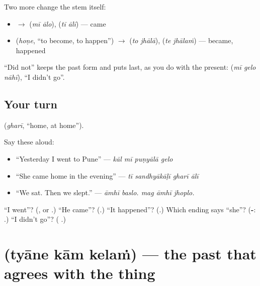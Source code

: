Two more change the stem itself:

\begin{itemize}
\raggedright
  \item \textbf{} $\to$ \textbf{ } (\emph{mī ālo}), \textbf{ } (\emph{tī ālī}) — came
  \item \textbf{} (\emph{hoṇe}, \textquotedblleft{}to become, to happen\textquotedblright{}) $\to$ \textbf{ } (\emph{to jhālā}), \textbf{ } (\emph{te jhālaṁ}) — became, happened
\end{itemize}

\textquotedblleft{}Did not\textquotedblright{} keeps the past form and puts \textbf{} last, as you do with the present: \textbf{  } (\emph{mī gelo nāhī}), \textquotedblleft{}I didn't go\textquotedblright{}.

\subsection*{Your turn}
\textbf{} (\emph{gharī}, \textquotedblleft{}home, at home\textquotedblright{}).

Say these aloud:

\begin{itemize}
\raggedright
  \item \textquotedblleft{}Yesterday I went to Pune\textquotedblright{} — \emph{kāl mī puṇyālā gelo}
  \item \textquotedblleft{}She came home in the evening\textquotedblright{} — \emph{tī sandhyākāḷī gharī ālī}
  \item \textquotedblleft{}We sat. Then we slept.\textquotedblright{} — \emph{āmhī baslo. mag āmhī jhoplo.}
\end{itemize}

\begin{tcolorbox}[breakable,colback=teal!4,colframe=teal!35!black,title={Before you move on}]
\textquotedblleft{}I went\textquotedblright{}? (\textbf{}, or \textbf{}.) \textquotedblleft{}He came\textquotedblright{}? (\textbf{}.) \textquotedblleft{}It happened\textquotedblright{}? (\textbf{}.) Which ending says \textquotedblleft{}she\textquotedblright{}? (\textbf{-}: \textbf{}.) \textquotedblleft{}I didn't go\textquotedblright{}? (\textbf{  }.)
\end{tcolorbox}
\section[\texorpdfstring{\mr{त्याने} \mr{काम} \mr{केलं} (tyāne kām kelaṁ)}{त्याने काम केलं (tyāne kām kelaṁ)}]{   (tyāne kām kelaṁ) — the past that agrees with the thing}

